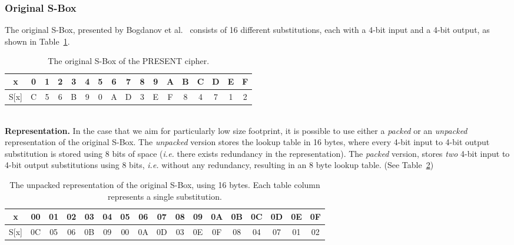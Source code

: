 \documentclass[11pt]{article}
\begin{document}
\subsubsection{Original S-Box}\label{osbox}
The original S-Box, presented by Bogdanov et al.~\cite{bogdanov2007present} consists of 16 different substitutions, each with a 4-bit input and a 4-bit output, as shown in Table~\ref{original_sbox}.
\begin{table}[h]
\footnotesize
\centering
\begin{tabular}{| c | c  | c | c | c  | c | c | c  | c | c | c  | c | c | c  | c | c | c |}
\hline
  x & 0 & 1 & 2 & 3 & 4 & 5 & 6 & 7 & 8 & 9 & A & B & C & D & E & F   \\
\hline
  S[x] & C & 5 & 6 & B & 9 & 0 & A & D & 3 & E & F & 8 & 4 & 7 & 1 & 2   \\
\hline
\end{tabular}
 \caption{\footnotesize The original S-Box of the PRESENT cipher.}
 \label{original_sbox}
\end{table}\\
\textbf{Representation.} In the case that we aim for particularly low size footprint, it is possible to use either a \emph{packed} or an \emph{unpacked} representation of the original S-Box. The \emph{unpacked} version stores the lookup table in 16 bytes, where every 4-bit input to 4-bit output substitution is stored using 8 bits of space (\emph{i.e.} there exists redundancy in the representation). The \emph{packed} version, stores \emph{two} 4-bit input to 4-bit output substitutions using 8 bits, \emph{i.e.} without any redundancy, resulting in an 8 byte lookup table. (See Table~\ref{unpacked_sbox}) \\
\begin{table}[h]
\centering
\scriptsize
\begin{tabular}{| c | c  | c | c | c  | c | c | c  | c | c | c  | c | c | c  | c | c | c |}
\hline
  x & 00 & 01 & 02 & 03 & 04 & 05 & 06 & 07 & 08 & 09 & 0A & 0B & 0C & 0D & 0E & 0F   \\
\hline
  S[x] & 0C & 05 & 06 & 0B & 09 & 00 & 0A & 0D & 03 & 0E & 0F & 08 & 04 & 07 & 01 & 02   \\
\hline
\end{tabular}
 \caption{\scriptsize The unpacked representation of the original S-Box, using 16 bytes. Each table column represents a single substitution.}
 \label{unpacked_sbox}
\end{table}\\
\end{document}
